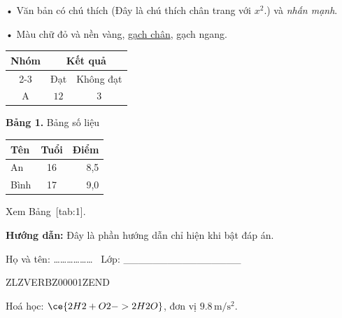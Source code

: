 \documentclass[12pt,a4paper]{article}
\begin{document}
• Văn bản có chú thích (Đây là chú thích chân trang với $x^2$.) và \emph{nhấn mạnh}.

• Màu chữ đỏ và nền vàng, \underline{gạch chân}, gạch ngang.



\begin{center}
\begin{tabular}{|c|c|c|}
\hline
\multirow{2}{*}{Nhóm} & \multicolumn{2}{c|}{Kết quả} \\
\cline{2-3}
 & Đạt & Không đạt \\
\hline
A & $12$ & $3$ \\
\hline
\end{tabular}
\end{center}

\begin{table}[h]
\centering


\begin{center}\textbf{Bảng 1.} Bảng số liệu\end{center}


\begin{tabular}{lcr}
\toprule
\textbf{Tên} & Tuổi & Điểm \\
\midrule
An & 16 & 8,5 \\
Bình & 17 & 9,0 \\
\bottomrule
\end{tabular}
\end{table}
Xem Bảng~[tab:1].


 \par\noindent\textbf{Hướng dẫn:} 
Đây là phần hướng dẫn chỉ hiện khi bật đáp án.
 \par 


Họ và tên:  ……………… \ Lớp:  ________________ 



ZLZVERBZ00001ZEND



Hoá học: $\ce{2H2 + O2 -> 2H2O}$, đơn vị $9.8\,\mathrm{m}/\mathrm{s}^2$.
\end{document}
